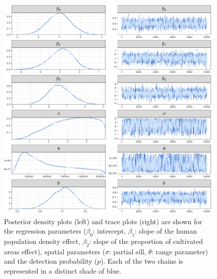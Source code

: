 \documentclass[
  11pt,
  a4paper,
]{article}
\begin{document}
\begin{figure}[b]

{\centering \includegraphics[width=0.98\linewidth]{posterior-trace} 

}

\caption{Posterior density plots (left) and trace plots (right) are shown for the regression parameters ($\beta_0$: intercept, $\beta_1$: slope of the human population density effect, $\beta_2$: slope of the proportion of cultivated areas effect), spatial parameters ($\sigma$: partial sill, $\theta$: range parameter) and the detection probability ($p$). Each of the two chains is represented in a distinct shade of blue.}\label{fig:postrace}
\end{figure}
\end{document}
